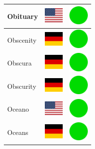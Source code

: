 \documentclass[12pt, a4paper, twoside]{report}
\begin{document}
\begin{center}
\begin{longtable}{|p{5cm}|p{2cm}|p{2cm}|}
 Obituary                                                   & \includegraphics[width=1cm]{../img/flags/us} &   \includegraphics[width=1cm]{../likes/y} \\ \hline
 Obscenity                                                  & \includegraphics[width=1cm]{../img/flags/de} &   \includegraphics[width=1cm]{../likes/y} \\ \hline
 Obscura                                                    & \includegraphics[width=1cm]{../img/flags/de} &   \includegraphics[width=1cm]{../likes/y} \\ \hline
 Obscurity                                                  & \includegraphics[width=1cm]{../img/flags/de} &   \includegraphics[width=1cm]{../likes/y} \\ \hline
 Oceano                                                     & \includegraphics[width=1cm]{../img/flags/us} &   \includegraphics[width=1cm]{../likes/y} \\ \hline
 Oceans                                                     & \includegraphics[width=1cm]{../img/flags/de} &   \includegraphics[width=1cm]{../likes/y} \\ \hline

\end{longtable}
\end{center}
\end{document}
